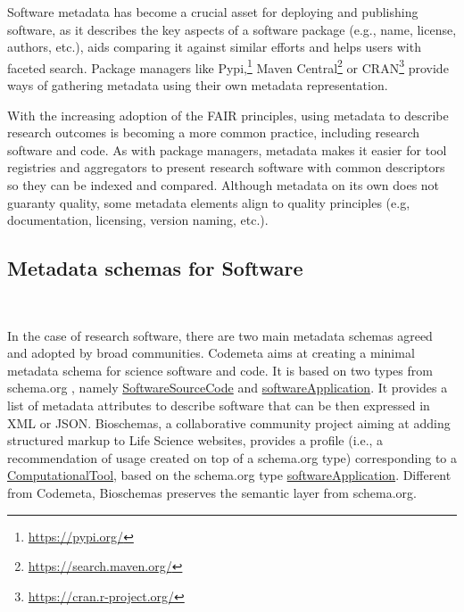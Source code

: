 
Software metadata has become a crucial asset for deploying and publishing software, as it describes the key aspects of a software package (e.g., name, license, authors, etc.), aids comparing it against similar efforts and helps users with faceted search. Package managers like Pypi,\footnote{\url{https://pypi.org/}} Maven Central\footnote{\url{https://search.maven.org/}} or CRAN\footnote{\url{https://cran.r-project.org/}} provide ways of gathering metadata using their own metadata representation.

With the increasing adoption of the FAIR principles, using metadata to describe research outcomes is becoming a more common practice, including research software and code. As with package managers, metadata makes it easier for tool registries and aggregators to present research software with common descriptors so they can be indexed and compared. Although metadata on its own does not guaranty quality, some metadata elements align to quality principles (e.g, documentation, licensing, version naming, etc.). 

\subsection{Metadata schemas for Software}

~\cite{sirs_2019}

In the case of research software, there are two main metadata schemas agreed and adopted by broad communities. Codemeta \cite{Boettigeral2017} aims at creating a minimal metadata schema for science software and code. It is based on two types from schema.org \cite{guha_schemaorg_2016}, namely \href{https://schema.org/SoftwareSourceCode}{SoftwareSourceCode} and \href{https://schema.org/SoftwareApplication}{softwareApplication}. It provides a list of metadata attributes to describe software that can be then expressed in XML or JSON. Bioschemas, a collaborative community project aiming at adding structured markup to Life Science websites, provides a profile (i.e., a recommendation of usage created on top of a schema.org type) corresponding to a \href{https://bioschemas.org/profiles/ComputationalTool}{ComputationalTool}, based on the schema.org type \href{https://schema.org/SoftwareApplication}{softwareApplication}. Different from Codemeta, Bioschemas preserves the semantic layer from schema.org.

